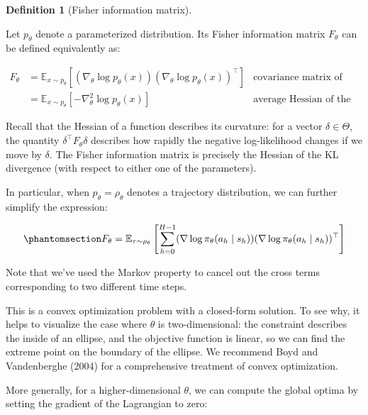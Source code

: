 \documentclass[
  letterpaper,
  DIV=11,
  numbers=noendperiod]{scrreprt}
\theoremstyle{plain}
\theoremstyle{plain}
\theoremstyle{definition}
\theoremstyle{definition}
\newtheorem{definition}{Definition}[chapter]
\theoremstyle{remark}
\begin{document}
\begin{definition}[Fisher information
matrix]\protect\hypertarget{def-fisher_matrix}{}\label{def-fisher_matrix}

Let \(p_\theta\) denote a parameterized distribution. Its Fisher
information matrix \(F_\theta\) can be defined equivalently as:

\[
\begin{aligned}
        F_{\theta} & = \mathbb{E}_{x \sim p_\theta} \left[ (\nabla_\theta \log p_\theta(x)) (\nabla_\theta \log p_\theta(x))^\top \right] & \text{covariance matrix of the Fisher score}          \\
                   & = \mathbb{E}_{x \sim p_{\theta}} [- \nabla_\theta^2 \log p_\theta(x)]                                                & \text{average Hessian of the negative log-likelihood}
\end{aligned}
\]

Recall that the Hessian of a function describes its curvature: for a
vector \(\delta \in \Theta\), the quantity
\(\delta^\top F_\theta \delta\) describes how rapidly the negative
log-likelihood changes if we move by \(\delta\). The Fisher information
matrix is precisely the Hessian of the KL divergence (with respect to
either one of the parameters).

In particular, when \(p_\theta = \rho_{\theta}\) denotes a trajectory
distribution, we can further simplify the expression:

\begin{equation}\phantomsection\label{eq-fisher_trajectory}{
F_{\theta} = \mathbb{E}_{\tau \sim \rho_\theta} \left[ \sum_{h=0}^{H-1} (\nabla \log \pi_\theta (a_h\mid s_h)) (\nabla \log \pi_\theta(a_h\mid s_h))^\top \right]
}\end{equation}

Note that we've used the Markov property to cancel out the cross terms
corresponding to two different time steps.

\end{definition}

This is a convex optimization problem with a closed-form solution. To
see why, it helps to visualize the case where \(\theta\) is
two-dimensional: the constraint describes the inside of an ellipse, and
the objective function is linear, so we can find the extreme point on
the boundary of the ellipse. We recommend Boyd and Vandenberghe (2004)
for a comprehensive treatment of convex optimization.

More generally, for a higher-dimensional \(\theta\), we can compute the
global optima by setting the gradient of the Lagrangian to zero:
\end{document}

